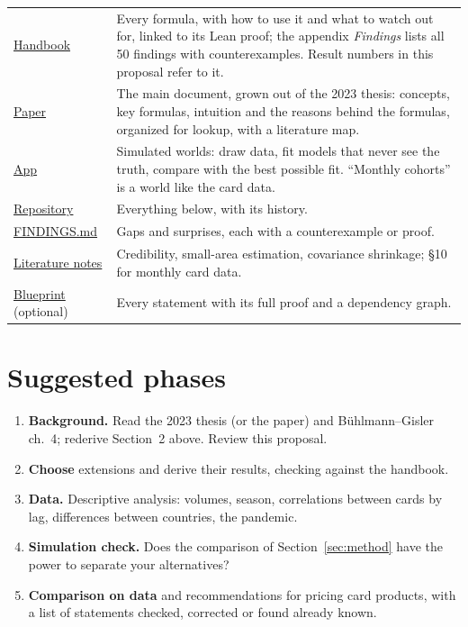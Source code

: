 \documentclass[10pt]{article}
\newcommand{\rowsep}{\specialrule{0.2pt}{3pt}{3pt}}
\newcommand{\site}{https://mikaelandblom-coder.github.io/credible-lean/}
\newcommand{\repo}{https://github.com/mikaelandblom-coder/credible-lean}
\begin{document}
\begin{center}\small
\begin{tabular}{>{\raggedright}p{3.6cm} >{\raggedright\arraybackslash}p{11.2cm}}
  \toprule
  \href{\site handbook.pdf}{Handbook} & Every formula, with how to use it and what to watch out for, linked to its Lean proof;
    the appendix \emph{Findings} lists all 50 findings with counterexamples. Result numbers in this
    proposal refer to it. \\ \rowsep
  \href{\site paper/}{Paper} & The main document, grown out of the 2023 thesis: concepts, key formulas, intuition and the reasons behind the
    formulas, organized for lookup, with a literature map. \\ \rowsep
  \href{\site app/}{App} & Simulated worlds: draw data, fit models that never see the truth,
    compare with the best possible fit. ``Monthly cohorts'' is a world like the card data. \\ \rowsep
  \href{\repo}{Repository} & Everything below, with its history. \\ \rowsep
  \href{\repo/blob/main/FINDINGS.md}{FINDINGS.md} & Gaps and surprises, each with a counterexample
    or proof. \\ \rowsep
  \href{\repo/blob/main/studies/literature.md}{Literature notes} & Credibility, small-area
    estimation, covariance shrinkage; \S10 for monthly card data. \\ \rowsep
  \href{\site}{Blueprint} (optional) & Every statement with its full proof and a dependency graph. \\
  \bottomrule
\end{tabular}
\end{center}

\section{Suggested phases}

\begin{enumerate}\setlength{\itemsep}{1pt}
  \item \textbf{Background.} Read the 2023 thesis (or the paper) and Bühlmann--Gisler ch.~4;
    rederive Section~2 above. Review this proposal.
  \item \textbf{Choose} extensions and derive their results, checking against the handbook.
  \item \textbf{Data.} Descriptive analysis: volumes, season, correlations between cards by lag,
    differences between countries, the pandemic.
  \item \textbf{Simulation check.} Does the comparison of Section~\ref{sec:method} have the power to
    separate your alternatives?
  \item \textbf{Comparison on data} and recommendations for pricing card products, with a list of
    statements checked, corrected or found already known.
\end{enumerate}
\end{document}
